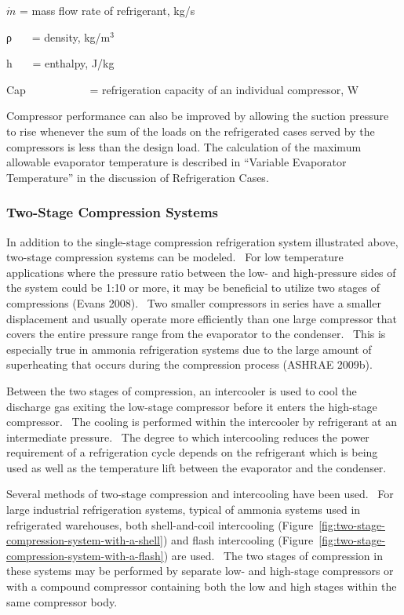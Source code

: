 \(\dot m\) = mass flow rate of refrigerant, kg/s

ρ~~~ = density, kg/m\(^{3}\)

h~~~ = enthalpy, J/kg

Cap~~~~~~~~~~~ = refrigeration capacity of an individual compressor, W

Compressor performance can also be improved by allowing the suction pressure to rise whenever the sum of the loads on the refrigerated cases served by the compressors is less than the design load. The calculation of the maximum allowable evaporator temperature is described in ``Variable Evaporator Temperature'' in the discussion of Refrigeration Cases.

\subsubsection{Two-Stage Compression Systems}\label{two-stage-compression-systems}

In addition to the single-stage compression refrigeration system illustrated above, two-stage compression systems can be modeled.~ For low temperature applications where the pressure ratio between the low- and high-pressure sides of the system could be 1:10 or more, it may be beneficial to utilize two stages of compressions (Evans 2008).~ Two smaller compressors in series have a smaller displacement and usually operate more efficiently than one large compressor that covers the entire pressure range from the evaporator to the condenser.~ This is especially true in ammonia refrigeration systems due to the large amount of superheating that occurs during the compression process (ASHRAE 2009b).

Between the two stages of compression, an intercooler is used to cool the discharge gas exiting the low-stage compressor before it enters the high-stage compressor.~ The cooling is performed within the intercooler by refrigerant at an intermediate pressure.~ The degree to which intercooling reduces the power requirement of a refrigeration cycle depends on the refrigerant which is being used as well as the temperature lift between the evaporator and the condenser.

Several methods of two-stage compression and intercooling have been used.~ For large industrial refrigeration systems, typical of ammonia systems used in refrigerated warehouses, both shell-and-coil intercooling (Figure~\ref{fig:two-stage-compression-system-with-a-shell}) and flash intercooling (Figure~\ref{fig:two-stage-compression-system-with-a-flash}) are used.~ The two stages of compression in these systems may be performed by separate low- and high-stage compressors or with a compound compressor containing both the low and high stages within the same compressor body.

